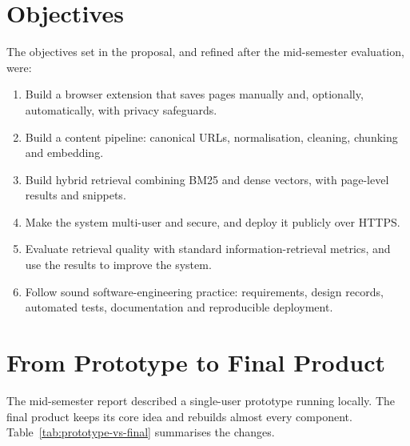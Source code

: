 \section{Objectives}

The objectives set in the proposal, and refined after the mid-semester
evaluation, were:

\begin{enumerate}
  \item Build a browser extension that saves pages manually and, optionally,
  automatically, with privacy safeguards.
  \item Build a content pipeline: canonical URLs, normalisation, cleaning,
  chunking and embedding.
  \item Build hybrid retrieval combining BM25 and dense vectors, with
  page-level results and snippets.
  \item Make the system multi-user and secure, and deploy it publicly over
  HTTPS.
  \item Evaluate retrieval quality with standard information-retrieval
  metrics, and use the results to improve the system.
  \item Follow sound software-engineering practice: requirements, design
  records, automated tests, documentation and reproducible deployment.
\end{enumerate}

\section{From Prototype to Final Product}

The mid-semester report described a single-user prototype running locally.
The final product keeps its core idea and rebuilds almost every component.
Table~\ref{tab:prototype-vs-final} summarises the changes.

